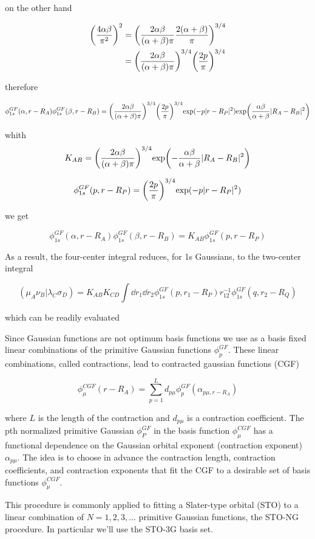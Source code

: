 \documentclass[11pt]{article}
\begin{document}
on the other hand

\begin{align*}
    \qty(\frac{4\alpha\beta}{\pi^2})^2 &= \qty(\frac{2\alpha\beta}{(\alpha+\beta)\pi} \frac{2(\alpha+\beta)}{\pi})^{3/4} \\
    &= \qty(\frac{2\alpha\beta}{(\alpha+\beta)\pi})^{3/4}\qty(\frac{2p}{\pi})^{3/4}
\end{align*}

therefore

\[ \phi_{1s}^{GF}(\alpha,r-R_A)\phi_{1s}^{GF}(\beta,r-R_B)=\qty(\frac{2\alpha\beta}{(\alpha+\beta)\pi})^{3/4} \qty(\frac{2p}{\pi})^{3/4} \text{exp}(-p|r-R_P|^2) \text{exp}\qty(\frac{\alpha\beta}{\alpha+\beta}|R_A-R_B|^2) \]

whith
\[ K_{AB} = \qty(\frac{2\alpha\beta}{(\alpha+\beta)\pi})^{3/4} \text{exp}\qty(-\frac{\alpha\beta}{\alpha+\beta}|R_A-R_B|^2) \]

\[ \phi_{1s}^{GF}(p,r-R_P) = \qty(\frac{2p}{\pi})^{3/4} \text{exp}(-p|r-R_P|^2) \]

we get

\[ \phi_{1s}^{GF}(\alpha,r-R_A)\phi_{1s}^{GF}(\beta,r-R_B)= K_{AB} \phi_{1s}^{GF}(p,r-R_P) \]

As a result, the four-center integral reduces, for 1s Gaussians, to the two-center integral

\[ (\mu_A\nu_B|\lambda_C\sigma_D) = K_{AB}K_{CD} \int \dd{r_1}\dd{r_2} \phi_{1s}^{GF}(p,r_1-R_P)r_{12}^{-1}\phi_{1s}^{GF}(q,r_2-R_Q) \]

which can be readily evaluated

Since Gaussian functions are not optimum basis functions we use as a basis fixed linear combinations of the primitive Gaussian functions \(\phi_p^{GF}\). These linear combinations, called contractions, lead to contracted gaussian functions (CGF)

\[ \phi_{\mu}^{CGF}(r-R_A) = \sum_{p=1}^L d_{p\mu}\phi_p^{GF}(\alpha_{p\mu, r-R_A}) \]

where \(L\) is the length of the contraction and \(d_{p\mu}\) is a contraction coefficient. The pth normalized primitive Gaussian \(\phi_P^{GF}\) in the basis function \(\phi_{\mu}^{CGF}\) has a functional dependence on the Gaussian orbital exponent (contraction exponent) \(\alpha_{p\mu}\). The idea is to choose in advance the contraction length, contraction coefficients, and contraction exponents that fit the CGF to a desirable set of basis functions \(\phi_{\mu}^{CGF}\).

This procedure is commonly applied to fitting a Slater-type orbital (STO) to a linear combination of \(N = 1,2,3,...\) primitive Gaussian functions, the STO-NG procedure. In particular we'll use the STO-3G basis set.
\end{document}
